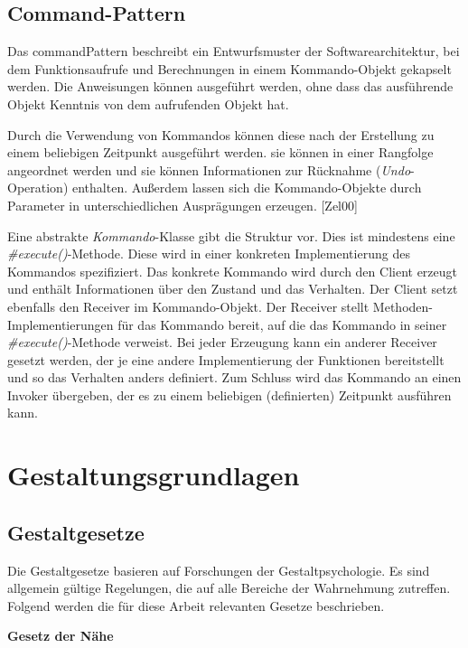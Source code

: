 \subsection{Command-Pattern} \label{sec:patternCommand}
Das \gls{commandPattern} beschreibt ein Entwurfsmuster der Softwarearchitektur, bei dem Funktionsaufrufe und Berechnungen in einem Kommando-Objekt gekapselt werden. Die Anweisungen können ausgeführt werden, ohne dass das ausführende Objekt Kenntnis von dem aufrufenden Objekt hat. \cite{Command}

Durch die Verwendung von Kommandos können diese nach der Erstellung zu einem beliebigen Zeitpunkt ausgeführt werden. sie können in einer Rangfolge angeordnet werden und sie können Informationen zur Rücknahme (\textit{Undo}-Operation) enthalten. Außerdem lassen sich die Kommando-Objekte durch Parameter in unterschiedlichen Ausprägungen erzeugen. [Zel00]

Eine abstrakte \textit{Kommando}-Klasse gibt die Struktur vor. Dies ist mindestens eine \textit{\#execute()}-Methode. Diese wird in einer konkreten Implementierung des Kommandos spezifiziert. \cite{Command}
Das konkrete Kommando wird durch den Client erzeugt und enthält Informationen über den Zustand und das Verhalten. Der Client setzt ebenfalls den Receiver im Kommando-Objekt. Der Receiver stellt Methoden-Implementierungen für das Kommando bereit, auf die das Kommando in seiner \textit{\#execute()}-Methode verweist. Bei jeder Erzeugung kann ein anderer Receiver gesetzt werden, der je eine andere Implementierung der Funktionen bereitstellt und so das Verhalten anders definiert. Zum Schluss wird das Kommando an einen Invoker übergeben, der es zu einem beliebigen (definierten) Zeitpunkt ausführen kann. \cite{Command}

\section{Gestaltungsgrundlagen} \label{sec:grundGestalt}
\subsection{Gestaltgesetze} \label{sec:gestaltGesetze}
Die Gestaltgesetze basieren auf Forschungen der Gestaltpsychologie. Es sind allgemein gültige Regelungen, die auf alle Bereiche der Wahrnehmung zutreffen. Folgend werden die für diese Arbeit relevanten Gesetze beschrieben.

\textbf{Gesetz der Nähe}


